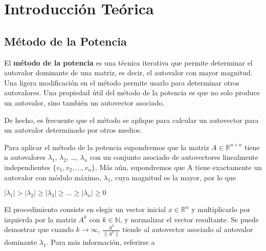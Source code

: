 \section{Introducci\'on Te\'orica}
\subsection{M\'etodo de la Potencia}
El \textbf{m\'etodo de la potencia} es una técnica iterativa que permite determinar el autovalor dominante de una matriz, es decir, el autovalor con mayor magnitud. Una ligera modificación en el método permite usarlo para determinar otros autovalores. Una propiedad útil del método de la potencia es que no solo produce un autovalor, sino también un autovector asociado. 

De hecho, es frecuente que el método se aplique para calcular un autovector para un autovalor determinado por otros medios.

Para aplicar el método de la potencia supondremos que la matriz $A \in \mathbb{R}^{n \times n}$
tiene n autovalores $\lambda_1$, $\lambda_2$, \ldots , $\lambda_n$ con un conjunto asociado de
autovectores linealmente independientes $\{v_1,v_2, \ldots, v_n\}$. Más aún, supondremos que A tiene
exactamente un autovalor con módulo máximo, $\lambda_1$, cuya magnitud es la mayor, por lo que
\begin{center}
$|\lambda_1| > |\lambda_2| \geq |\lambda_3| \geq \ldots \geq |\lambda_n| \geq 0$
\end{center}

%
%
%
%
%
%

El procedimiento consiste en elegir un vector inicial $x \in \mathbb{R}^n$ y multiplicarlo por
izquierda por la matriz $A^k$ con $k \in \mathbb{N}$, y normalizar el vector resultante. Se puede
demostrar que cuando $k \rightarrow \infty$, $\frac{A^k}{\| A^k \| }$ tiende al autovector asociado
al autovalor  dominante $\lambda_1$. Para más información, referirse a \cite{burden}

